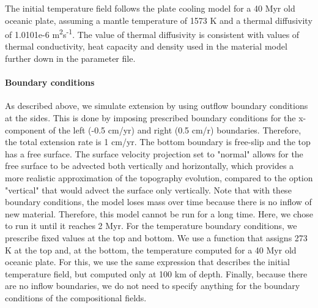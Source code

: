 


The initial temperature field follows the plate cooling model for a 40 Myr old oceanic plate, assuming a mantle temperature of 1573 K and a thermal diffusivity of 1.0101e-6 m\textsuperscript{2}s\textsuperscript{-1}. The value of thermal diffusivity is consistent with values of thermal conductivity, heat capacity and density used in the material model further down in the parameter file.




\paragraph{Boundary conditions}
As described above, we simulate extension by using outflow boundary conditions at the sides. This is done by imposing prescribed boundary conditions for the x-component of the left (-0.5 cm/yr) and right (0.5 cm/r) boundaries. Therefore, the total extension rate is 1 cm/yr. The bottom boundary is free-slip and the top has a free surface. The surface velocity projection set to "normal" allows for the free surface to be advected both vertically and horizontally, which provides a more realistic approximation of the topography evolution, compared to the option "vertical" that would advect the surface only vertically. Note that with these boundary conditions, the model loses mass over time because there is no inflow of new material. Therefore, this model cannot be run for a long time. Here, we chose to run it until it reaches 2 Myr. 
For the temperature boundary conditions, we prescribe fixed values at the top and bottom. We use a function that assigns 273 K at the top and, at the bottom, the temperature computed for a 40 Myr old oceanic plate. For this, we use the same expression that describes the initial temperature field, but computed only at 100 km of depth. 
Finally, because there are no inflow boundaries, we do not need to specify anything for the boundary conditions of the compositional fields.




